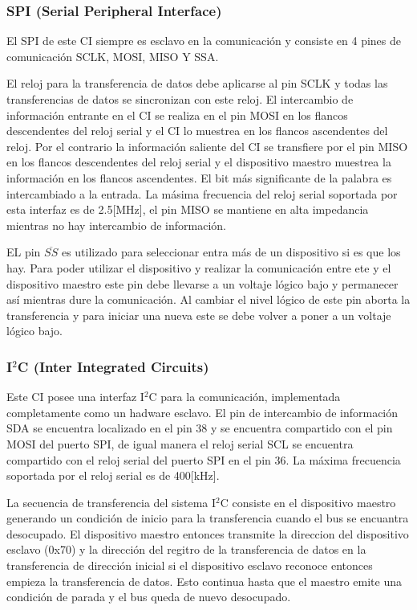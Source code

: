 \documentclass[letterpaper,12pt,oneside]{book}
\begin{document}
			\subsubsection{SPI (Serial Peripheral Interface)}
			El SPI de este CI siempre es esclavo en la comunicación y consiste en 4 pines de comunicación SCLK, MOSI, MISO Y SSA.

			El reloj para la transferencia de datos debe aplicarse al pin SCLK y todas las transferencias de datos se sincronizan con este reloj. El intercambio de información entrante en el CI se realiza en el pin MOSI en los flancos descendentes del reloj serial y el CI lo muestrea en los flancos ascendentes del reloj. Por el contrario la información saliente del CI se transfiere por el pin MISO en los flancos descendentes del reloj serial y el dispositivo maestro muestrea la información en los flancos ascendentes. El bit más significante de la palabra es intercambiado a la entrada. La másima frecuencia del reloj serial soportada por esta interfaz es de 2.5[MHz], el pin MISO se mantiene en alta impedancia mientras no hay intercambio de información.

			EL pin $\overline{SS}$ es utilizado para seleccionar entra más de un dispositivo si es que los hay. Para poder utilizar el dispositivo y realizar la comunicación entre ete y el dispositivo maestro este pin debe llevarse a un voltaje lógico bajo y permanecer así mientras dure la comunicación. Al cambiar el nivel lógico de este pin aborta la transferencia y para iniciar una nueva este se debe volver a poner a un voltaje lógico bajo.

			\subsubsection{I$^2$C (Inter Integrated Circuits)}
			Este CI posee una interfaz I$^2$C para la comunicación, implementada completamente como un hadware esclavo. El pin de intercambio de información SDA se encuentra localizado en el pin 38 y se encuentra compartido con el pin MOSI del puerto SPI, de igual manera el reloj serial SCL se encuentra compartido con el reloj serial del puerto SPI en el pin 36. La máxima frecuencia soportada por el reloj serial es de 400[kHz].

			La secuencia de transferencia del sistema I$^2$C consiste en el dispositivo maestro generando un condición de inicio para la transferencia cuando el bus se encuantra desocupado. El dispositivo maestro entonces transmite la direccion del dispositivo esclavo (0x70) y la dirección del regitro de la transferencia de datos en la transferencia de dirección inicial si el dispositivo esclavo reconoce entonces empieza la transferencia de datos. Esto continua hasta que el maestro emite una condición de parada y el bus queda de nuevo desocupado.
\end{document}

